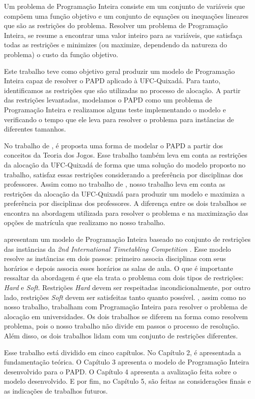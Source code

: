 Um problema de Programação Inteira consiste em um conjunto de variáveis que compõem uma função objetivo e um conjunto de equações ou inequações lineares que são as restrições do problema. Resolver um problema de Programação Inteira, se resume a encontrar uma valor inteiro para as variáveis, que satisfaça todas as restrições e minimizes (ou maximize, dependendo da natureza do problema) o custo da função objetivo.

Este trabalho teve como objetivo geral produzir um modelo de Programação Inteira capaz de resolver o PAPD aplicado à UFC-Quixadá. Para tanto, identificamos as restrições que são utilizadas no processo de alocação. A partir das restrições levantadas, modelamos o PAPD como um problema de Programação Inteira e realizamos alguns teste implementando o modelo e verificando o tempo que ele leva para resolver o problema para instâncias de diferentes tamanhos.

No trabalho de , é proposta uma forma de modelar o PAPD a partir dos conceitos da Teoria dos Jogos. Esse trabalho também leva em conta as restrições da alocação da UFC-Quixadá de forma que uma solução do modelo proposto no trabalho, satisfaz essas restrições considerando a preferência por disciplinas dos professores. Assim como no trabalho de , nosso trabalho leva em conta as restrições da alocação da UFC-Quixadá para produzir um modelo e maximiza a preferência por disciplinas dos professores. A diferença entre os dois trabalhos se encontra na abordagem utilizada para resolver o problema e na maximização das opções de matrícula que realizamo no nosso trabalho. 

 apresentam um modelo de Programação Inteira baseado no conjunto de restrições das instâncias da \textit{2nd International Timetabling Competition} \cite{itc}. Esse modelo resolve as instâncias em dois passos: primeiro  associa disciplinas com seus horários e depois associa esses horários as salas de aula. O que é importante ressaltar da abordagem é que ela trata o problema com dois tipos de restrições: \textit{Hard} e \textit{Soft}. Restrições \textit{Hard} devem ser respeitadas incondicionalmente, por outro lado, restrições \textit{Soft} devem ser satisfeitas tanto quanto possível. , assim como no nosso trabalho, trabalham com Programação Inteira para resolver o problema de alocação em universidades. Os dois trabalhos se diferem na forma como resolvem problema, pois o nosso trabalho não divide em passos o processo de resolução. Além disso, os dois trabalhos lidam com um conjunto de restrições diferentes.

Esse trabalho está dividido em cinco capítulos. No Capítulo 2, é apresentada a fundamentação teórica. O Capítulo 3 apresenta o modelo de Programação Inteira desenvolvido para o PAPD. O Capítulo 4 apresenta a avalização feita sobre o modelo desenvolvido. E por fim, no Capítulo 5, são feitas as considerações finais e as indicações de trabalhos futuros.

	